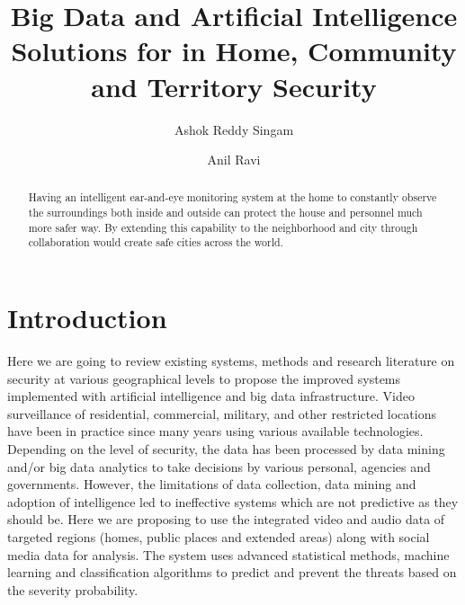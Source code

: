 \documentclass[sigconf]{acmart}
\begin{document}
\title{Big Data and Artificial Intelligence Solutions for in Home, Community and Territory Security}


\author{Ashok Reddy Singam}

\author{Anil Ravi}

\begin{abstract}
Having an intelligent ear-and-eye monitoring system at the home to constantly observe the surroundings both inside and outside can protect the house and personnel much more safer way. By extending this capability to the neighborhood and city through collaboration would create safe cities across the world.

\end{abstract}



\maketitle

\section{Introduction}

Here we are going to review existing systems, methods and research literature on security at various geographical levels to propose the improved systems implemented with artificial intelligence and big data infrastructure. Video surveillance of residential, commercial, military, and other restricted locations have been in practice since many years using various available technologies. Depending on the level of security, the data has been processed by data mining and/or big data analytics to take decisions by various personal, agencies and governments. However, the limitations of data collection, data mining and adoption of intelligence led to ineffective systems which are not predictive as they should be. Here we are proposing to use the integrated video and audio data of targeted regions (homes, public places and extended areas) along with social media data for analysis. The system uses advanced statistical methods, machine learning and classification algorithms to predict and prevent the threats based on the severity probability.
\end{document}
